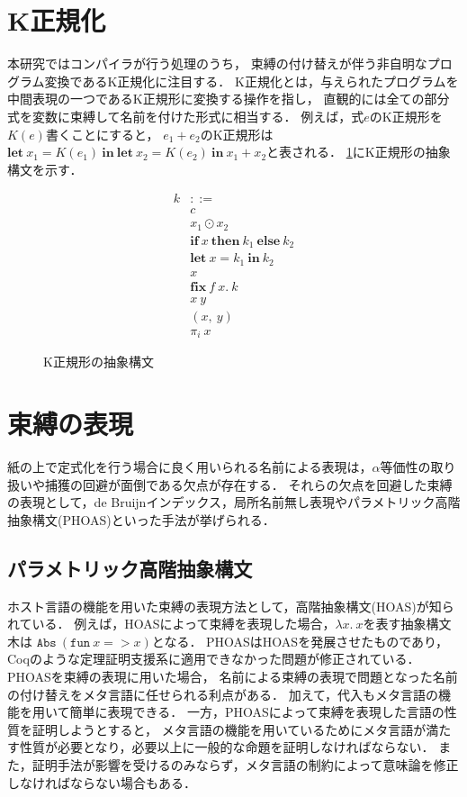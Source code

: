 \documentclass[T]{compsoft}
\newcommand{\keyword}[1]{\mathbf{#1}}
\newcommand{\IF}{\keyword{if}}
\newcommand{\THEN}{\keyword{then}}
\newcommand{\ELSE}{\keyword{else}}
\newcommand{\LET}{\keyword{let}}
\newcommand{\FIX}{\keyword{fix}}
\newcommand{\IN}{\keyword{in}}
\begin{document}
\section{K正規化}
本研究ではコンパイラが行う処理のうち，
束縛の付け替えが伴う非自明なプログラム変換であるK正規化に注目する．
K正規化とは，与えられたプログラムを中間表現の一つであるK正規形\cite{Birkedal:1996:RIV:237721.237771}に変換する操作を指し，
直観的には全ての部分式を変数に束縛して名前を付けた形式に相当する．
例えば，式$e$のK正規形を$K(e)$書くことにすると，
$e_1+e_2$のK正規形は$\LET~x_1=K(e_1)~\IN~\LET~x_2=K(e_2)~\IN~x_1+x_2$と表される．
\figurename\ref{eqn:mincaml-knormal}にK正規形の抽象構文を示す．

\begin{figure}[htbp]
	\[ \begin{array}{ll}
			k & ::= \\
				& c \\
				& x_1 \odot x_2 \\
				& \IF~x~\THEN~k_1~\ELSE~k_2 \\
			 	& \LET~x=k_1~\IN~k_2 \\
				& x \\
				& \FIX~f~x.~k \\
				& x~y \\
				& (x,~y) \\
				& \pi_i~x 
	\end{array} \]
	\caption{K正規形の抽象構文}
	\label{eqn:mincaml-knormal}
\end{figure}

\section{束縛の表現}
紙の上で定式化を行う場合に良く用いられる名前による表現は，$\alpha$等価性の取り扱いや捕獲の回避が面倒である欠点が存在する．
それらの欠点を回避した束縛の表現として，de Bruijnインデックス\cite{Pierce:TypeSystems}，局所名前無し表現\cite{chargueraud-11-ln}やパラメトリック高階抽象構文(PHOAS)\cite{Chlipala:2008:PHA:1411204.1411226}といった手法が挙げられる．

\subsection{パラメトリック高階抽象構文}
ホスト言語の機能を用いた束縛の表現方法として，高階抽象構文(HOAS)が知られている．
例えば，HOASによって束縛を表現した場合，$\lambda x.~x$を表す抽象構文木は
$\texttt{Abs}~(\texttt{fun}~x => x)$となる．
PHOASはHOASを発展させたものであり，
Coqのような定理証明支援系に適用できなかった問題が修正されている．
PHOASを束縛の表現に用いた場合，
名前による束縛の表現で問題となった名前の付け替えをメタ言語に任せられる利点がある．
加えて，代入もメタ言語の機能を用いて簡単に表現できる．
一方，PHOASによって束縛を表現した言語の性質を証明しようとすると，
メタ言語の機能を用いているためにメタ言語が満たす性質が必要となり，必要以上に一般的な命題を証明しなければならない．
また，証明手法が影響を受けるのみならず，メタ言語の制約によって意味論を修正しなければならない場合もある．
\end{document}
